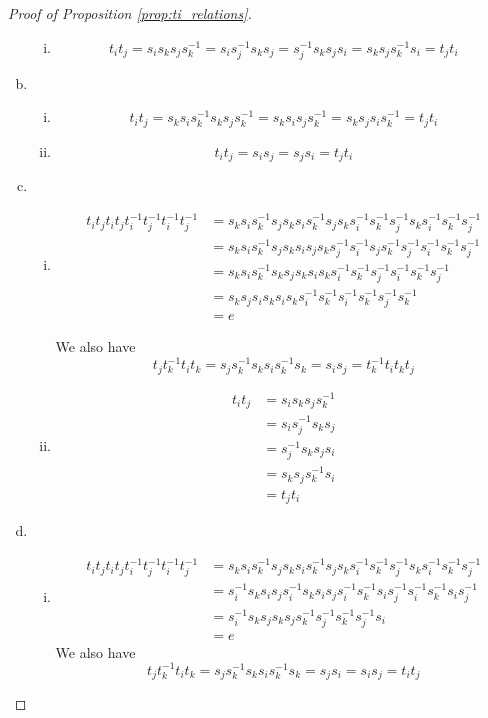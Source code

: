 \documentclass[11pt]{amsart}
\theoremstyle{definition}
\begin{document}
\begin{proof}[Proof of Proposition \ref{prop:ti_relations}]
\begin{enumerate}[a)]
\begin{enumerate}[i)]
\item $$t_it_j = s_is_ks_js_k^{-1} = s_is_j^{-1}s_ks_j = s_j^{-1}s_ks_js_i = s_ks_js_k^{-1}s_i = t_jt_i$$
\end{enumerate}
\item
\begin{enumerate}[i)]
\item $$t_it_j = s_ks_is_k^{-1}s_ks_js_k^{-1} = s_ks_is_js_k^{-1} = s_ks_js_is_k^{-1} = t_jt_i$$
\item $$t_it_j = s_is_j = s_js_i = t_jt_i$$
\end{enumerate}
\item
\begin{enumerate}[i)]
\item
\begin{align*}
t_it_jt_it_jt_i^{-1}t_j^{-1}t_i^{-1}t_j^{-1} &= s_ks_is_k^{-1}s_js_ks_is_k^{-1}s_js_ks_i^{-1}s_k^{-1}s_j^{-1}s_ks_i^{-1}s_k^{-1}s_j^{-1}\\
&=s_ks_is_k^{-1}s_js_ks_is_js_ks_j^{-1}s_i^{-1}s_js_k^{-1}s_j^{-1}s_i^{-1}s_k^{-1}s_j^{-1}\\
&=s_ks_is_k^{-1}s_ks_js_ks_is_ks_i^{-1}s_k^{-1}s_j^{-1}s_i^{-1}s_k^{-1}s_j^{-1}\\
&=s_ks_js_is_ks_is_ks_i^{-1}s_k^{-1}s_i^{-1}s_k^{-1}s_j^{-1}s_k^{-1}\\
&= e
\end{align*}

We also have
$$t_jt_k^{-1}t_it_k = s_js_k^{-1}s_ks_is_k^{-1}s_k = s_is_j = t_k^{-1}t_it_kt_j$$ 

\item
\begin{align*}
t_it_j &= s_is_ks_js_k^{-1}\\
&= s_is_j^{-1}s_ks_j\\
&= s_j^{-1}s_ks_js_i\\
&= s_ks_js_k^{-1}s_i\\
&= t_jt_i
\end{align*}
\end{enumerate}
\item
\begin{enumerate}[i)]
\item
\begin{align*}
t_it_jt_it_jt_i^{-1}t_j^{-1}t_i^{-1}t_j^{-1} &= s_ks_is_k^{-1}s_js_ks_is_k^{-1}s_js_ks_i^{-1}s_k^{-1}s_j^{-1}s_ks_i^{-1}s_k^{-1}s_j^{-1}\\
&= s_i^{-1}s_ks_is_js_i^{-1}s_ks_is_js_i^{-1}s_k^{-1}s_is_j^{-1}s_i^{-1}s_k^{-1}s_is_j^{-1}\\
&= s_i^{-1}s_ks_js_ks_js_k^{-1}s_j^{-1}s_k^{-1}s_j^{-1}s_i\\
&= e
\end{align*}
We also have
$$ t_jt_k^{-1}t_it_k = s_js_k^{-1}s_ks_is_k^{-1}s_k = s_js_i = s_is_j = t_it_j$$


\end{enumerate}
\end{enumerate}
\end{proof}
\end{document}
